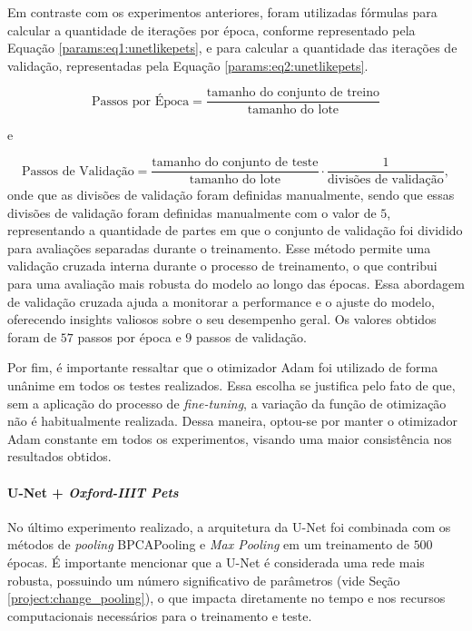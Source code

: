 Em contraste com os experimentos anteriores, foram utilizadas fórmulas para calcular a quantidade de iterações por época, conforme representado pela Equação \ref{params:eq1:unetlikepets}, e para calcular a quantidade das iterações de validação, representadas pela Equação \ref{params:eq2:unetlikepets}.

\begin{equation}
    \label{params:eq1:unetlikepets}
    \text{Passos por Época} = \frac{\text{tamanho do conjunto de treino}}{\text{tamanho do lote}}
\end{equation}

e

\begin{equation}
    \label{params:eq2:unetlikepets}
    \text{Passos de Validação} = \frac{\text{tamanho do conjunto de teste}}{\text{tamanho do lote}} \cdot \frac{1}{\text{divisões de validação}},
\end{equation}
onde que as divisões de validação foram definidas manualmente, sendo que essas divisões de validação foram definidas manualmente com o valor de $5$, representando a quantidade de partes em que o conjunto de validação foi dividido para avaliações separadas durante o treinamento. Esse método permite uma validação cruzada interna durante o processo de treinamento, o que contribui para uma avaliação mais robusta do modelo ao longo das épocas. Essa abordagem de validação cruzada ajuda a monitorar a performance e o ajuste do modelo, oferecendo insights valiosos sobre o seu desempenho geral. Os valores obtidos foram de $57$ passos por época e $9$ passos de validação.

Por fim, é importante ressaltar que o otimizador Adam foi utilizado de forma unânime em todos os testes realizados. Essa escolha se justifica pelo fato de que, sem a aplicação do processo de \textit{fine-tuning}, a variação da função de otimização não é habitualmente realizada. Dessa maneira, optou-se por manter o otimizador Adam constante em todos os experimentos, visando uma maior consistência nos resultados obtidos.


\paragraph{U-Net + \textit{Oxford-IIIT Pets}}
\label{params:unetpets}
No último experimento realizado, a arquitetura da U-Net foi combinada com os métodos de \textit{pooling} BPCAPooling e \textit{Max Pooling} em um treinamento de $500$ épocas. É importante mencionar que a U-Net é considerada uma rede mais robusta, possuindo um número significativo de parâmetros (vide Seção \ref{project:change_pooling}), o que impacta diretamente no tempo e nos recursos computacionais necessários para o treinamento e teste.

